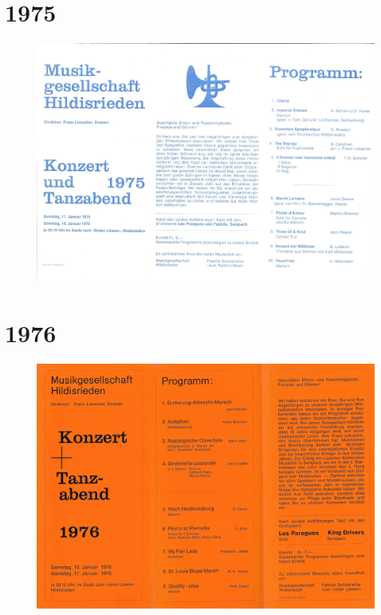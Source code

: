 \documentclass{book}
\begin{document}
\pagebreak
\section{1975}
\begin{figure}[p]
    \includegraphics[scale=0.7]{./chap/1975/1975.pdf}
\end{figure}


\pagebreak
\section{1976}
\begin{figure}[p]
    \includegraphics[scale=0.7]{./chap/1976/1976.pdf}
\end{figure}

\end{document}
